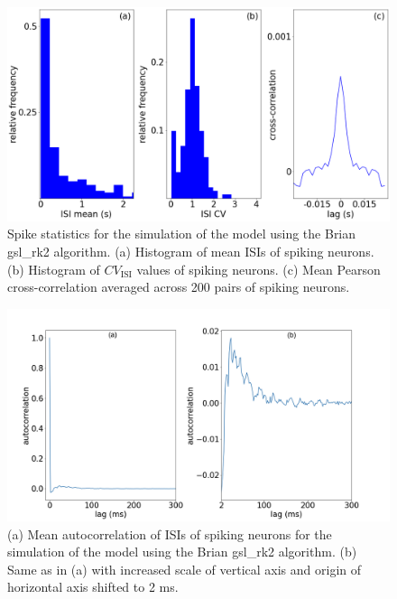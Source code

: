\begin{figure}[H]
    \centering
    \includegraphics[scale=0.3]{ISIrk23.png}
    \caption{Spike statistics for the simulation of the model using the Brian gsl\_rk2 algorithm. (a) Histogram of mean ISIs of spiking neurons. (b) Histogram of $CV_{\text{ISI}}$ values of spiking neurons. (c) Mean Pearson cross-correlation averaged across 200 pairs of spiking neurons.}
    \label{fig:ISIrk2}
\end{figure}

\begin{figure}[H]
    \centering
    \includegraphics[scale=0.3]{autocorrrk2.png}
    \caption{(a) Mean autocorrelation of ISIs of spiking neurons for the simulation of the model using the Brian gsl\_rk2 algorithm. (b) Same as in (a) with increased scale of vertical axis and origin of horizontal axis shifted to 2 ms.}
    \label{fig:ISIautoCrk2}
\end{figure}

